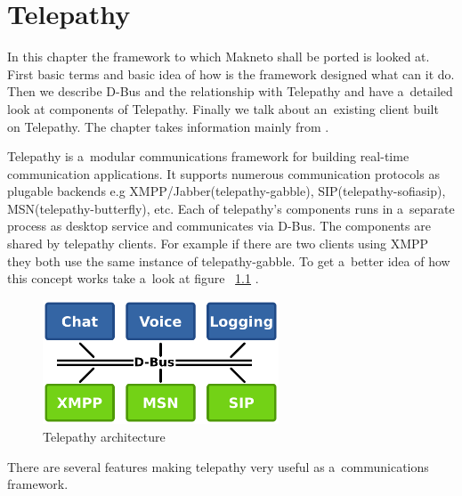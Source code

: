 
\chapter{Telepathy}\label{chapter:telepathy}
In this chapter the framework to which Makneto shall be ported is looked at. First basic terms and basic idea of how is the framework designed what can it do. Then we describe D-Bus and the relationship with Telepathy and have a~detailed look at components of Telepathy. Finally we talk about an~existing client built on Telepathy. The chapter takes information mainly from \cite{TPWiki, dbus}. 

Telepathy \cite{telepathy} is a~modular communications framework for building real-time communication applications. It supports numerous communication protocols as plugable backends e.g XMPP/Jabber(telepathy-gabble), SIP(telepathy-sofiasip), MSN(telepathy-butterfly), etc. Each of telepathy's components runs in a~separate process as desktop service and communicates via D-Bus. The components are shared by telepathy clients. For example if there are two clients using XMPP they both use the same instance of telepathy-gabble. To get a~better idea of how this concept works take a~look at figure ~\ref{fig:telepathyArchitecture} \cite{TPWiki}.

\begin{figure}[ht]
\begin{center}
	\includegraphics[width=7cm]{fig/telepathy-architecture-overview.png}
	\caption{Telepathy architecture \cite{TPWiki}}
	\label{fig:telepathyArchitecture}
\end{center}
\end{figure}


There are several features making telepathy very useful as a~communications framework.

